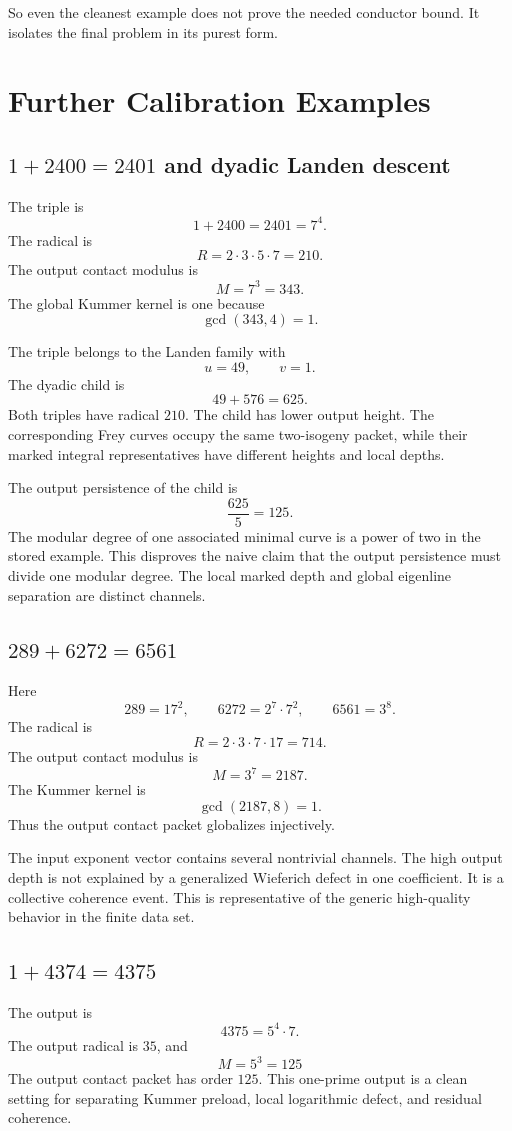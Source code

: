 So even the cleanest example does not prove the needed conductor bound. It isolates the final problem in its purest form.

\chapter{Further Calibration Examples}

\section{\texorpdfstring{$1+2400=2401$}{1+2400=2401} and dyadic Landen descent}
The triple is
\[
 1+2400=2401=7^4.
\]
The radical is
\[
 R=2\cdot3\cdot5\cdot7=210.
\]
The output contact modulus is
\[
 M=7^3=343.
\]
The global Kummer kernel is one because
\[
 \gcd(343,4)=1.
\]

The triple belongs to the Landen family with
\[
 u=49,
 \qquad
 v=1.
\]
The dyadic child is
\[
 49+576=625.
\]
Both triples have radical $210$. The child has lower output height. The corresponding Frey curves occupy the same two-isogeny packet, while their marked integral representatives have different heights and local depths.

The output persistence of the child is
\[
 \frac{625}{5}=125.
\]
The modular degree of one associated minimal curve is a power of two in the stored example. This disproves the naive claim that the output persistence must divide one modular degree. The local marked depth and global eigenline separation are distinct channels.

\section{\texorpdfstring{$289+6272=6561$}{289+6272=6561}}
Here
\[
 289=17^2,
 \qquad
 6272=2^7\cdot7^2,
 \qquad
 6561=3^8.
\]
The radical is
\[
 R=2\cdot3\cdot7\cdot17=714.
\]
The output contact modulus is
\[
 M=3^7=2187.
\]
The Kummer kernel is
\[
 \gcd(2187,8)=1.
\]
Thus the output contact packet globalizes injectively.

The input exponent vector contains several nontrivial channels. The high output depth is not explained by a generalized Wieferich defect in one coefficient. It is a collective coherence event. This is representative of the generic high-quality behavior in the finite data set.

\section{\texorpdfstring{$1+4374=4375$}{1+4374=4375}}
The output is
\[
 4375=5^4\cdot7.
\]
The output radical is $35$, and
\[
 M=5^3=125
\]
The output contact packet has order $125$. This one-prime output is a clean setting for separating Kummer preload, local logarithmic defect, and residual coherence.

